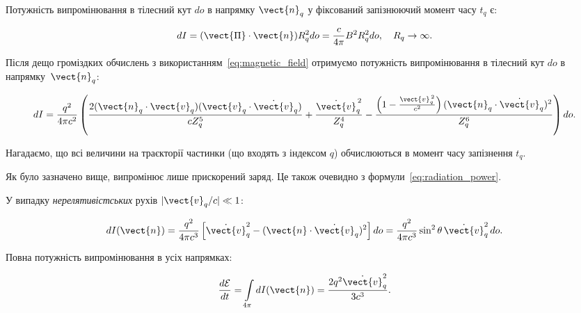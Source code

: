 Потужність випромінювання в тілесний кут \( do \) в напрямку $\vect{n}_q$ у фіксований запізнюючий момент часу \( t_q \)
є:

\begin{equation*}
	dI = (\vect{\Pi} \cdot \vect{n}) R_q^2 do = \frac{c}{4\pi} B^2 R_q^2 do, \quad R_q \to \infty.
\end{equation*}

Після дещо громіздких обчислень з використанням~\eqref{eq:magnetic_field} отримуємо потужність випромінювання в тілесний
кут \( do \) в напрямку~\( \vect{n}_q \):

\begin{equation}
    dI = \frac{q^2}{4\pi c^2}
    \left(
    \frac{2 ( \vect{n}_q \cdot \vect{v}_q ) (\vect{v}_q \cdot \dot{\vect{v}}_q)}{c Z_q^5}
    + \frac{\dot{\vect{v}}_q^{\,2}}{Z_q^4}
    - \frac{\left(1 - \frac{\vect{v}_q^{\,2}}{c^2}\right) (\vect{n}_q \cdot \dot{\vect{v}}_q)^2}{Z_q^6}
    \right) do.
	\label{eq:radiation_power}
\end{equation}

Нагадаємо, що всі величини на траєкторії частинки (що входять з індексом \( q \)) обчислюються в момент часу запізнення
\( t_q \).

Як було зазначено вище, випромінює лише прискорений заряд. Це також очевидно з формули~\eqref{eq:radiation_power}.

У випадку \emph{нерелятивістських} рухів \( |\vect{v}_q/c| \ll 1 \):

\begin{equation*}
	dI(\vect{n}) = \frac{q^2}{4\pi c^3} \left[ \dot{\vect{v}}_q^2 - (\vect{n} \cdot \dot{\vect{v}}_q)^2 \right] do = \frac{q^2}{4\pi c^3} \sin^2 \theta
	\, \dot{\vect{v}}_q^2 \, do.
\end{equation*}

Повна потужність випромінювання в усіх напрямках:

\begin{equation}\label{eq:total_power_nonrel}
	\frac{d\mathcal{E}}{dt} = \int\limits_{4\pi} dI(\vect{n}) = \frac{2q^2 \dot{\vect{v}}_q^2}{3c^3}.
\end{equation}

